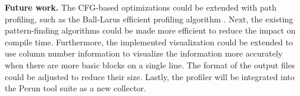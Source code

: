 \medskip
\noindent
\textbf{Future work.} The CFG-based optimizations could be extended with path profiling, such as the Ball-Larus efficient profiling algorithm \cite{ball-larus}. Next, the existing pattern-finding algorithms could be made more efficient to reduce the impact on compile time. Furthermore, the implemented visualization could be extended to use column number information to visualize the information more accurately when there are more basic blocks on a single line. The format of the output files could be adjusted to reduce their size. Lastly, the profiler will be integrated into the Perun tool suite as a new collector.


% 